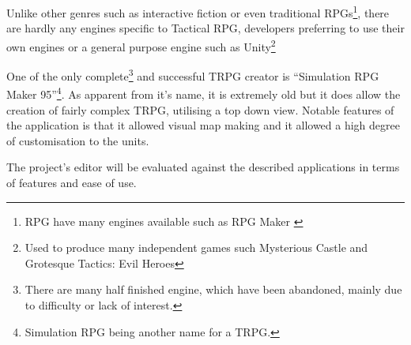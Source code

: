 Unlike other genres such as interactive fiction\cite{Bogdan2010Interactive-Fic} or even traditional RPGs\footnote{RPG have many engines available such as RPG Maker \cite{rpgmaker}}, there are hardly any engines specific to Tactical RPG, developers preferring to use their own engines or a general purpose engine such as Unity\footnote{Used to produce many independent games such Mysterious Castle and Grotesque Tactics: Evil Heroes}

One of the only complete\footnote{There are many half finished engine, which have been abandoned, mainly due to difficulty or lack of interest.} and successful TRPG creator is ``Simulation RPG Maker 95''\footnote{Simulation RPG being another name for a TRPG.}.  As apparent from it's name, it is extremely old but it does allow the creation of fairly complex TRPG, utilising a top down view. Notable features of the application is that it allowed visual map making and it allowed a high degree of customisation to the units. 

The project's editor will be evaluated against the described applications in terms of features and ease of use. 

